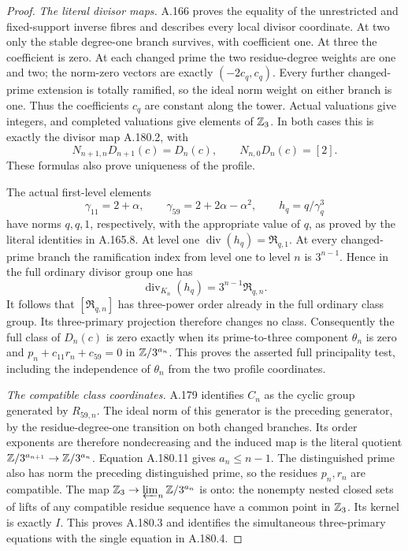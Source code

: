 \begin{proof}
\emph{The literal divisor maps.}
A.166 proves the equality of the unrestricted and fixed-support
inverse fibres and describes every local divisor coordinate.
At two only the stable degree-one branch survives, with coefficient
one.  At three the coefficient is zero.  At each changed prime the
two residue-degree weights are one and two; the norm-zero vectors
are exactly \((-2c_q,c_q)\).  Every further changed-prime extension
is totally ramified, so the ideal norm weight on either branch is
one.  Thus the coefficients \(c_q\) are constant along the tower.
Actual valuations give integers, and completed valuations give
elements of \(\mathbb Z_3\).  In both cases this is exactly the divisor
map A.180.2, with
\[
 N_{n+1,n}D_{n+1}(c)=D_n(c),\qquad
                  N_{n,0}D_n(c)=[2].
\tag{A.180.9}
\]
These formulas also prove uniqueness of the profile.

The actual first-level elements
\[
 \gamma_{11}=2+\alpha,\qquad
 \gamma_{59}=2+2\alpha-\alpha^2,\qquad
 h_q=q/\gamma_q^3
\tag{A.180.10}
\]
have norms \(q,q,1\), respectively, with the appropriate value
of \(q\), as proved by the literal identities in A.165.8.
At level one \(\operatorname{div}(h_q)=\mathfrak R_{q,1}\).
At every changed-prime branch the ramification index from level one
to level \(n\) is \(3^{n-1}\).  Hence in the full ordinary
divisor group one has
\[
                 \operatorname{div}_{K_n}(h_q)
                              =3^{n-1}\mathfrak R_{q,n}.
\tag{A.180.11}
\]
It follows that \([\mathfrak R_{q,n}]\) has three-power order
already in the full ordinary class group.  Its three-primary
projection therefore changes no class.  Consequently the full
class of \(D_n(c)\) is zero exactly when its prime-to-three
component \(\theta_n\) is zero and
\(p_n+c_{11}r_n+c_{59}=0\) in \(\mathbb Z/3^{a_n}\).
This proves the asserted full principality test, including the
independence of \(\theta_n\) from the two profile coordinates.

\emph{The compatible class coordinates.}
A.179 identifies \(C_n\) as the cyclic group generated by
\(R_{59,n}\).  The ideal norm of this generator is the preceding
generator, by the residue-degree-one transition on both changed
branches.  Its order exponents are therefore nondecreasing and
the induced map is the literal quotient
\(\mathbb Z/3^{a_{n+1}}\to\mathbb Z/3^{a_n}\).
Equation A.180.11 gives \(a_n\le n-1\).
The distinguished prime also has norm the preceding distinguished
prime, so the residues \(p_n,r_n\) are compatible.
The map \(\mathbb Z_3\to\varprojlim_n\mathbb Z/3^{a_n}\) is onto:
the nonempty nested closed sets of lifts of any compatible residue
sequence have a common point in \(\mathbb Z_3\).
Its kernel is exactly \(I\).  This proves A.180.3 and identifies
the simultaneous three-primary equations with the single equation
in A.180.4.


\end{proof}
